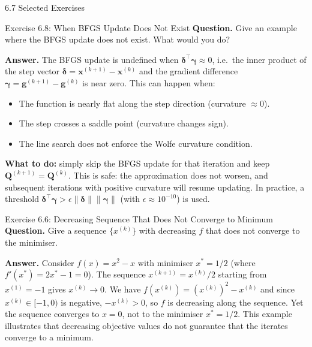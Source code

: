 \documentclass[aspectratio=169,10pt]{beamer}
\newcommand{\xbf}{\mathbf{x}}
\newcommand{\gbf}{\mathbf{g}}
\newcommand{\deltabf}{\boldsymbol{\delta}}
\newcommand{\gammabf}{\boldsymbol{\gamma}}
\begin{document}
\begin{frame}[allowframebreaks]{6.7 Selected Exercises}
  \framebreak

  \begin{block}{Exercise 6.8: When BFGS Update Does Not Exist}
    \textbf{Question.} Give an example where the BFGS update does not exist.
    What would you do?

    \medskip
    \textbf{Answer.} The BFGS update is undefined when $\deltabf^\top\gammabf
    \approx 0$, i.e.\ the inner product of the step vector $\deltabf = \xbf^{(k+1)}
    - \xbf^{(k)}$ and the gradient difference $\gammabf = \gbf^{(k+1)} - \gbf^{(k)}$
    is near zero.  This can happen when:
    \begin{itemize}
      \item The function is nearly flat along the step direction (curvature $\approx 0$).
      \item The step crosses a saddle point (curvature changes sign).
      \item The line search does not enforce the Wolfe curvature condition.
    \end{itemize}
    \textbf{What to do:} simply skip the BFGS update for that iteration and keep
    $\mathbf{Q}^{(k+1)} = \mathbf{Q}^{(k)}$.  This is safe: the approximation
    does not worsen, and subsequent iterations with positive curvature will resume
    updating.  In practice, a threshold $\deltabf^\top\gammabf > \epsilon
    \|\deltabf\|\|\gammabf\|$ (with $\epsilon \approx 10^{-10}$) is used.
  \end{block}

  \begin{block}{Exercise 6.6: Decreasing Sequence That Does Not Converge to Minimum}
    \textbf{Question.} Give a sequence $\{x^{(k)}\}$ with decreasing $f$ that
    does not converge to the minimiser.

    \medskip
    \textbf{Answer.} Consider $f(x) = x^2 - x$ with minimiser $x^* = 1/2$ (where
    $f'(x^*) = 2x^* - 1 = 0$).  The sequence $x^{(k+1)} = x^{(k)}/2$ starting
    from $x^{(1)} = -1$ gives $x^{(k)} \to 0$.  We have $f(x^{(k)}) = (x^{(k)})^2
    - x^{(k)}$ and since $x^{(k)} \in [-1, 0)$ is negative, $-x^{(k)} > 0$, so
    $f$ is decreasing along the sequence.  Yet the sequence converges to $x = 0$,
    not to the minimiser $x^* = 1/2$.  This example illustrates that decreasing
    objective values do not guarantee that the iterates converge to a minimum.
  \end{block}

\end{frame}
\end{document}
